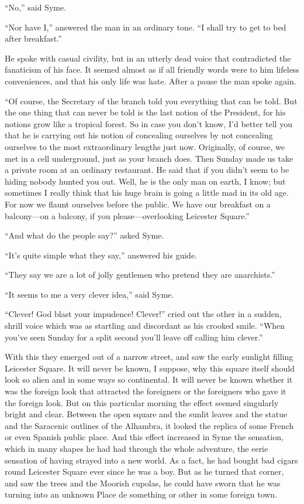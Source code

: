“No,” said Syme.

“Nor have I,” answered the man in an ordinary tone. “I shall try to get to bed after breakfast.”

He spoke with casual civility, but in an utterly dead voice that contradicted the fanaticism of his face. It seemed almost as if all friendly words were to him lifeless conveniences, and that his only life was hate. After a pause the man spoke again.

“Of course, the Secretary of the branch told you everything that can be told. But the one thing that can never be told is the last notion of the President, for his notions grow like a tropical forest. So in case you don’t know, I’d better tell you that he is carrying out his notion of concealing ourselves by not concealing ourselves to the most extraordinary lengths just now. Originally, of course, we met in a cell underground, just as your branch does. Then Sunday made us take a private room at an ordinary restaurant. He said that if you didn’t seem to be hiding nobody hunted you out. Well, he is the only man on earth, I know; but sometimes I really think that his huge brain is going a little mad in its old age. For now we flaunt ourselves before the public. We have our breakfast on a balcony⁠—on a balcony, if you please⁠—overlooking Leicester Square.”

“And what do the people say?” asked Syme.

“It’s quite simple what they say,” answered his guide.

“They say we are a lot of jolly gentlemen who pretend they are anarchists.”

“It seems to me a very clever idea,” said Syme.

“Clever! God blast your impudence! Clever!” cried out the other in a sudden, shrill voice which was as startling and discordant as his crooked smile. “When you’ve seen Sunday for a split second you’ll leave off calling him clever.”

With this they emerged out of a narrow street, and saw the early sunlight filling Leicester Square. It will never be known, I suppose, why this square itself should look so alien and in some ways so continental. It will never be known whether it was the foreign look that attracted the foreigners or the foreigners who gave it the foreign look. But on this particular morning the effect seemed singularly bright and clear. Between the open square and the sunlit leaves and the statue and the Saracenic outlines of the Alhambra, it looked the replica of some French or even Spanish public place. And this effect increased in Syme the sensation, which in many shapes he had had through the whole adventure, the eerie sensation of having strayed into a new world. As a fact, he had bought bad cigars round Leicester Square ever since he was a boy. But as he turned that corner, and saw the trees and the Moorish cupolas, he could have sworn that he was turning into an unknown Place de something or other in some foreign town.

